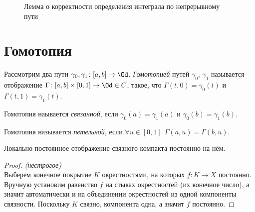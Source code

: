 \begin{figure}[ht]
    \centering
    \caption{Лемма о корректности определения интеграла по непрерывному пути}
\end{figure}

\section{Гомотопия}

\begin{definition}
    Рассмотрим два пути $\gamma_0, \gamma_1 \colon [a, b] \to \Od$.
    \textit{Гомотопией} путей $\gamma_0$, $\gamma_1$ называется отображение $\Gamma
    \colon [a, b] \times [0, 1] \to \Od \in C$, такое, что $\Gamma(t, 0) =
    \gamma_0(t)$ и $\Gamma(t, 1) = \gamma_1(t)$.
\end{definition}

\begin{definition}
    Гомотопия наывается \textit{связанной}, если $\gamma_0(a) = \gamma_1(a)$ и
    $\gamma_0(b) = \gamma_1(b)$.
\end{definition}

\begin{definition}
    Гомотопия называется \textit{петельной}, если $\forall u \in [0, 1]~~
    \Gamma(a, u) = \Gamma(b, u)$.
\end{definition}

\begin{lemma}
    Локально постоянное отображение связного компакта постоянно на нём.
\end{lemma}
\begin{proof}
    \textit{(нестрогое)} \\
    Выберем конечное покрытие $K$ окрестностями, на которых $f \colon K \to X$
    постоянно. Вручную установим равенство $f$ на стыках окрестностей (их
    конечное число), а значит автоматически и на объединении окрестностей из
    одной компоненты связности. Поскольку $K$ связно, компонента одна, а
    значит $f$ постоянно.
\end{proof}

